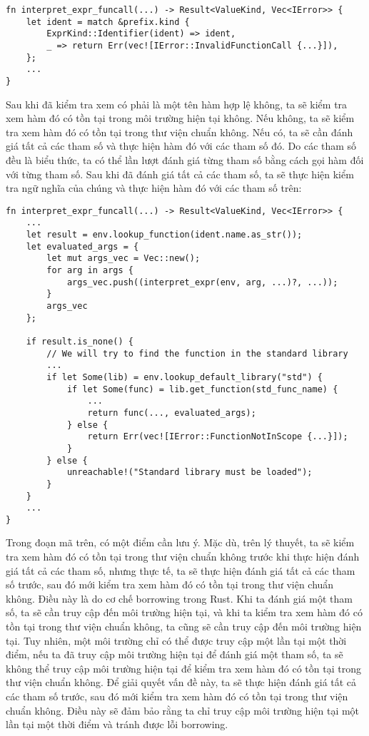 \begin{lstlisting}[]
fn interpret_expr_funcall(...) -> Result<ValueKind, Vec<IError>> {
    let ident = match &prefix.kind {
        ExprKind::Identifier(ident) => ident,
        _ => return Err(vec![IError::InvalidFunctionCall {...}]),
    };
    ...
}
\end{lstlisting}

Sau khi đã kiểm tra xem  có phải là một tên hàm hợp lệ không, ta sẽ kiểm tra xem hàm đó có tồn tại trong môi trường hiện tại không. Nếu không, ta sẽ kiểm tra xem hàm đó có tồn tại trong thư viện chuẩn không. Nếu có, ta sẽ cần đánh giá tất cả các tham số và thực hiện hàm đó với các tham số đó. Do các tham số đều là biểu thức, ta có thể lần lượt đánh giá từng tham số bằng cách gọi hàm  đối với từng tham số. Sau khi đã đánh giá tất cả các tham số, ta sẽ thực hiện kiểm tra ngữ nghĩa của chúng và thực hiện hàm đó với các tham số trên:

\begin{lstlisting}[]
fn interpret_expr_funcall(...) -> Result<ValueKind, Vec<IError>> {
    ...
    let result = env.lookup_function(ident.name.as_str());
    let evaluated_args = {
        let mut args_vec = Vec::new();
        for arg in args {
            args_vec.push((interpret_expr(env, arg, ...)?, ...));
        }
        args_vec
    };

    if result.is_none() {
        // We will try to find the function in the standard library
        ...
        if let Some(lib) = env.lookup_default_library("std") {
            if let Some(func) = lib.get_function(std_func_name) {
                ...
                return func(..., evaluated_args);
            } else {
                return Err(vec![IError::FunctionNotInScope {...}]);
            }
        } else {
            unreachable!("Standard library must be loaded");
        }
    }
    ...
}
\end{lstlisting}

    Trong đoạn mã trên, có một điểm cần lưu ý. Mặc dù, trên lý thuyết, ta sẽ kiểm tra xem hàm đó có tồn tại trong thư viện chuẩn không trước khi thực hiện đánh giá tất cả các tham số, nhưng thực tế, ta sẽ thực hiện đánh giá tất cả các tham số trước, sau đó mới kiểm tra xem hàm đó có tồn tại trong thư viện chuẩn không. Điều này là do cơ chế borrowing trong Rust. Khi ta đánh giá một tham số, ta sẽ cần truy cập đến môi trường hiện tại, và khi ta kiểm tra xem hàm đó có tồn tại trong thư viện chuẩn không, ta cũng sẽ cần truy cập đến môi trường hiện tại. Tuy nhiên, một môi trường chỉ có thể được truy cập một lần tại một thời điểm, nếu ta đã truy cập môi trường hiện tại để đánh giá một tham số, ta sẽ không thể truy cập môi trường hiện tại để kiểm tra xem hàm đó có tồn tại trong thư viện chuẩn không. Để giải quyết vấn đề này, ta sẽ thực hiện đánh giá tất cả các tham số trước, sau đó mới kiểm tra xem hàm đó có tồn tại trong thư viện chuẩn không. Điều này sẽ đảm bảo rằng ta chỉ truy cập môi trường hiện tại một lần tại một thời điểm và tránh được lỗi borrowing.

